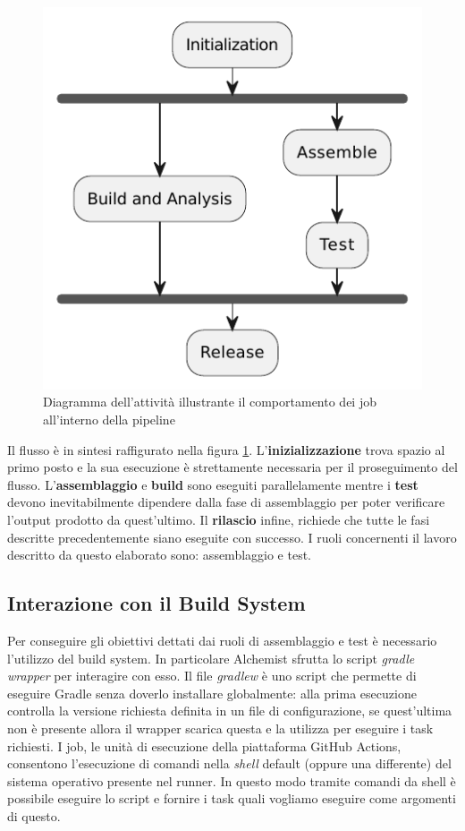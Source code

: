 \begin{figure}[htb]
	\centering
	\includegraphics[width=.5\linewidth]{figures/pipeline-roles.pdf}
	\caption{Diagramma dell'attività illustrante il comportamento dei job all'interno della pipeline}
	\label{fig:workflow-roles-summary}
\end{figure}

Il flusso è in sintesi raffigurato nella figura \ref{fig:workflow-roles-summary}. L'\textbf{inizializzazione} trova spazio al primo posto e la sua esecuzione è strettamente necessaria per il proseguimento del flusso. L'\textbf{assemblaggio} e \textbf{build} sono eseguiti parallelamente mentre i \textbf{test} devono inevitabilmente dipendere dalla fase di assemblaggio per poter verificare l'output prodotto da quest'ultimo. Il \textbf{rilascio} infine, richiede che tutte le fasi descritte precedentemente siano eseguite con successo. I ruoli concernenti il lavoro descritto da questo elaborato sono: assemblaggio e test.

\subsection{Interazione con il Build System}
Per conseguire gli obiettivi dettati dai ruoli di assemblaggio e test è necessario l'utilizzo del build system. In particolare Alchemist sfrutta lo script \textit{gradle wrapper} per interagire con esso. Il file \textit{gradlew} è uno script che permette di eseguire Gradle senza doverlo installare globalmente: alla prima esecuzione controlla la versione richiesta definita in un file di configurazione, se quest'ultima non è presente allora il wrapper scarica questa e la utilizza per eseguire i task richiesti. I job, le unità di esecuzione della piattaforma GitHub Actions, consentono l'esecuzione di comandi nella \textit{shell} default (oppure una differente) del sistema operativo presente nel runner. In questo modo tramite comandi da shell è possibile eseguire lo script e fornire i task quali vogliamo eseguire come argomenti di questo.

